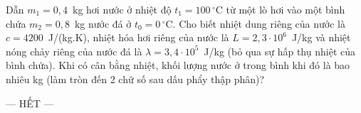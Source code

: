 	\begin{ex}%
		Dẫn $m_1=0{,}4$~kg hơi nước ở nhiệt độ $t_1=100\,^\circ\text{C}$ từ một lò hơi vào một bình chứa $m_2=0{,}8$~kg nước đá ở $t_0=0\,^\circ\text{C}$. Cho biết nhiệt dung riêng của nước là $c=4200$~J/(kg.K), nhiệt hóa hơi riêng của nước là $L=2{,}3\cdot 10^6$~J/kg và nhiệt nóng chảy riêng của nước đá là $\lambda=3{,}4\cdot 10^5$~J/kg (bỏ qua sự hấp thụ nhiệt của bình chứa). Khi có cân bằng nhiệt, khối lượng nước ở trong bình khi đó là bao nhiêu kg (làm tròn đến 2 chữ số sau dấu phẩy thập phân)?
		\par
	\end{ex}

	\centerline{--- HẾT ---}


